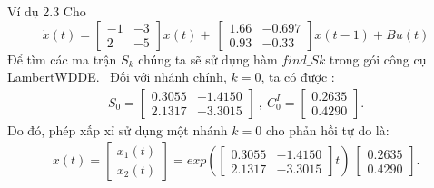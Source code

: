 \documentclass[10pt,notheorems]{beamer}
\theoremstyle{definition}
\theoremstyle{definition}
\theoremstyle{definition}
\newcommand{\m}[1]{
	\begin{bmatrix}
		#1
\end{bmatrix}}
\begin{document}
\begin{frame}{}
\begin{block}{Ví dụ 2.3} 
	Cho
	\begin{equation*}
	\dot{x}(t) =
	\begin{bmatrix}
	-1&-3 \\
	2&-5
	\end{bmatrix}x(t)+ \  
	\begin{bmatrix}
	1.66&-0.697\\
	0.93&-0.33
	\end{bmatrix}x(t-1)
	+Bu(t)
	\end{equation*}\pause
	Để tìm các ma trận $S_k$ chúng ta sẽ sử dụng hàm $find\_Sk$ trong gói công cụ LambertWDDE.\ \pause
	Đối với nhánh chính, $k = 0$, ta có được :
	\begin{align*}
	S_0=\begin{bmatrix}
	0.3055&-1.4150\\
	2.1317&-3.3015
	\end{bmatrix} \ ,  \ 
	C^I_0=\begin{bmatrix}
	0.2635\\
	0.4290
	\end{bmatrix}.
	\end{align*}\pause
%
Do đó, phép xấp xỉ sử dụng một nhánh $k = 0$ cho phản hồi tự do là:
\begin{align*}
x(t)=\begin{bmatrix}
x_1(t)\\
x_2(t)
\end{bmatrix}
= exp \left(
\begin{bmatrix}
0.3055&-1.4150\\
2.1317&-3.3015
\end{bmatrix} t
\right)
\ 
\begin{bmatrix}
0.2635\\
0.4290
\end{bmatrix}.
\end{align*}
%
\end{block}
\end{frame}
\end{document}
